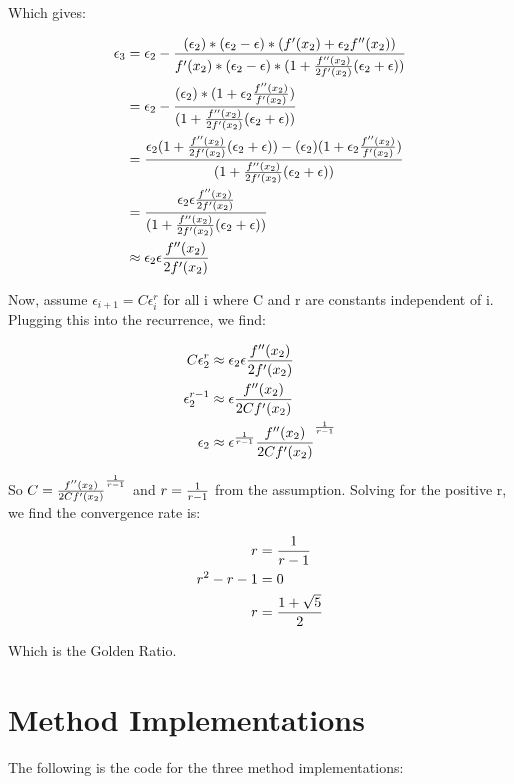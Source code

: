\documentclass{article}
\begin{document}
Which gives: 

\begin{align*}
	\epsilon_3 &= \epsilon_2 - {(\epsilon_2) * (\epsilon_2  - \epsilon) * ( f'(x_2) + \epsilon_2 f''(x_2)) \over 
						f'(x_2) * (\epsilon_2 - \epsilon) * (1 + {f''(x_2) \over 2f'(x_2)} (\epsilon_2 + \epsilon))} \\
			&=  \epsilon_2 - {(\epsilon_2) * (1 + \epsilon_2 {f''(x_2) \over f'(x_2)}) \over 
						(1 + {f''(x_2) \over 2f'(x_2)} (\epsilon_2 + \epsilon))} \\
			&= {\epsilon_2 (1 + {f''(x_2) \over 2f'(x_2)} (\epsilon_2 + \epsilon)) - (\epsilon_2) (1 + \epsilon_2 {f''(x_2) \over f'(x_2)}) \over 
						(1 + {f''(x_2) \over 2f'(x_2)} (\epsilon_2 + \epsilon))} \\
			&= {\epsilon_2  \epsilon {f''(x_2) \over 2f'(x_2)}  \over 
						(1 + {f''(x_2) \over 2f'(x_2)} (\epsilon_2 + \epsilon))} \\
			&\approx \epsilon_2  \epsilon {f''(x_2) \over 2f'(x_2)}
\end{align*}

Now, assume $\epsilon_{i+1} = C \epsilon_i ^ r$ for all i where C and r are constants independent of i. Plugging this into the recurrence, we find:

\begin{align*}
	C \epsilon_2 ^ r &\approx \epsilon_2  \epsilon {f''(x_2) \over 2f'(x_2)} \\
	\epsilon_2	 ^ {r-1} &\approx \epsilon {f''(x_2) \over 2Cf'(x_2)} \\
	\epsilon_2	 &\approx \epsilon ^ {1 \over r-1} {f''(x_2) \over 2Cf'(x_2)}^ {1 \over r-1} \\
\end{align*}

So $C = {f''(x_2) \over 2Cf'(x_2)}^ {1 \over r-1}$ and $r = {1 \over r - 1}$ from the assumption. Solving for the positive r, we find the convergence rate is:

\begin{align*}
	r &= {1 \over r - 1} \\
	r^2 - r - 1&= 0 \\
	r &= {1 + \sqrt5 \over 2}
\end{align*}

Which is the Golden Ratio.

\section{Method Implementations}
The following is the code for the three method implementations:
\end{document}
